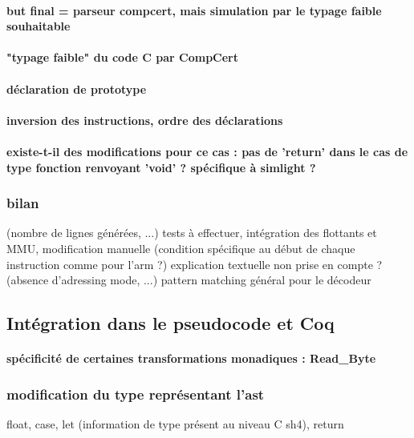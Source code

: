 \documentclass[a4paper, 11pt]{article}
\begin{document}
      \paragraph{but final = parseur compcert, mais simulation par le typage faible souhaitable}
      \paragraph{"typage faible" du code C par CompCert}
      \paragraph{déclaration de prototype}
      \paragraph{inversion des instructions, ordre des déclarations}
      \paragraph{existe-t-il des modifications pour ce cas : pas de 'return' dans le cas de type fonction renvoyant 'void' ? spécifique à simlight ?}


    \subsubsection{bilan} 
      (nombre de lignes générées, ...)
      tests à effectuer, intégration des flottants et MMU, modification manuelle (condition spécifique au début de chaque instruction comme pour l'arm ?) explication textuelle non prise en compte ?
 (absence d'adressing mode, ...)
pattern matching général pour le décodeur

  \subsection{Intégration dans le pseudocode et Coq}
      \paragraph{spécificité de certaines transformations monadiques : Read\_Byte}
    \subsubsection{modification du type représentant l'ast} 
    float, case, let (information de type présent au niveau C sh4), return
\end{document}
